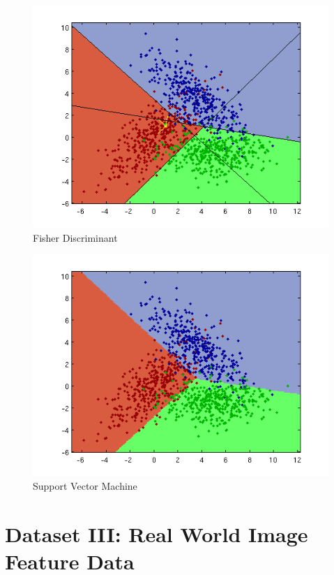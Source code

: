 \documentclass[a4paper]{article}
\begin{document}
\begin{figure}[htbp!]
\center
\includegraphics[clip, trim=40px 15px 30px 10px]{nls_fisher.png}
\caption{Fisher Discriminant}
\end{figure}


\begin{figure}[htbp!]
\center
\includegraphics[clip, trim=40px 15px 30px 10px]{svm_d.png}
\caption{Support Vector Machine}
\end{figure}

\section{Dataset III: Real World Image Feature Data}
\end{document}
